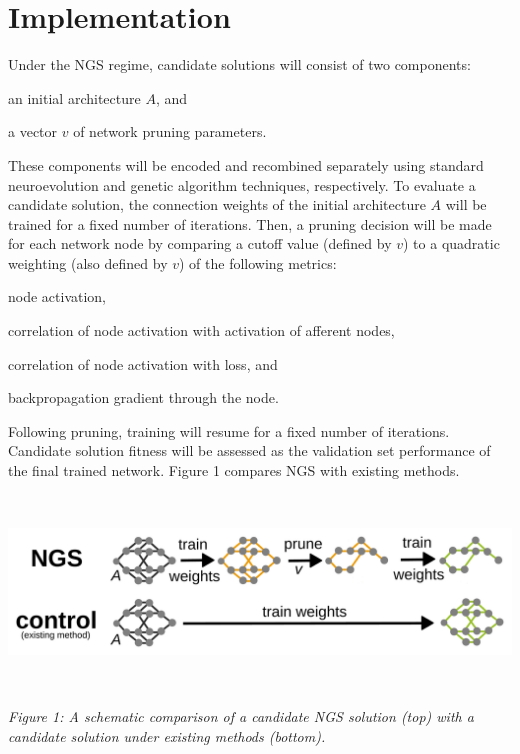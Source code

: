 \section{Implementation}

Under the NGS regime, candidate solutions will consist of two components:
\begin{enumerate*}[label=(\arabic*)]
\item an initial architecture $A$, and
\item a vector $v$ of network pruning parameters.
\end{enumerate*}
These components will be encoded and recombined separately using standard neuroevolution and genetic algorithm techniques, respectively.
To evaluate a candidate solution, the connection weights of the initial architecture $A$ will be trained for a fixed number of iterations.
Then, a pruning decision will be made for each network node by comparing a cutoff value (defined by $v$) to a quadratic weighting (also defined by $v$) of the following metrics:
\begin{enumerate*}[label=(\alph*)]
\item node activation,
\item correlation of node activation with activation of afferent nodes,
\item correlation of node activation with loss, and
\item backpropagation gradient through the node.
\end{enumerate*}
Following pruning, training will resume for a fixed number of iterations. Candidate solution fitness will be assessed as the validation set performance of the final trained network.
Figure 1 compares NGS with existing methods.

\noindent
\begin{minipage}{0.05\textwidth}
~
\end{minipage}%
\begin{minipage}{0.58\textwidth}
 \includegraphics[width=\textwidth]{img/complete}
\end{minipage}%
\begin{minipage}{0.05\textwidth}
~
\end{minipage}%
\begin{minipage}{0.3\textwidth}
  {
  \begin{footnotesize}
    \textit{
   Figure 1: A schematic comparison of a candidate NGS solution (top) with a candidate solution under existing methods (bottom).
   }
  \end{footnotesize}
  \par}
\end{minipage}%
\begin{minipage}{0.06\textwidth}
~
\end{minipage}%

